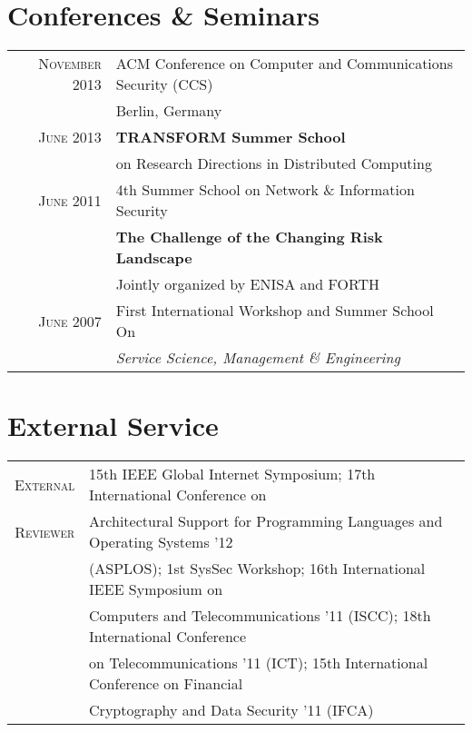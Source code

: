\documentclass[a4paper,10pt]{article} %
\begin{document}
\section{Conferences \& Seminars}

\begin{tabular}{rl}

\textsc{November 2013} & ACM Conference on Computer and Communications Security (CCS) \\
& Berlin, Germany \\

\textsc{June 2013} & \textbf{TRANSFORM Summer School} \\
& on Research Directions in Distributed Computing \\

\textsc{June 2011} & 4th Summer School on Network \& Information Security \\
& \textbf{The Challenge of the Changing Risk Landscape} \\
& \small Jointly organized by ENISA and FORTH \\

\textsc{June 2007} & First International Workshop and Summer School On \\
& \emph{Service Science, Management \& Engineering}

\end{tabular}


\section{External Service}

\begin{tabular}{rl}

\textsc{External} & 15th IEEE Global Internet Symposium; 17th International Conference on \\
\textsc{Reviewer} & Architectural Support for Programming Languages and Operating Systems '12 \\
& (ASPLOS); 1st SysSec Workshop; 16th International IEEE Symposium on \\
& Computers and Telecommunications '11 (ISCC); 18th International Conference \\
& on Telecommunications '11 (ICT); 15th International Conference on Financial \\
& Cryptography and Data Security '11 (IFCA) \\

\end{tabular}
\end{document}
